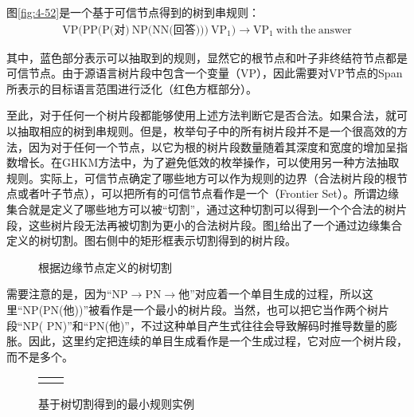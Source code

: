 \parinterval 图\ref{fig:4-52}是一个基于可信节点得到的树到串规则：
\begin{eqnarray}
\textrm{VP(PP(P(对)}\ \textrm{NP(NN(回答)))}\ \textrm{VP}_1) \rightarrow \textrm{VP}_1\ \textrm{with}\ \textrm{the}\ \textrm{answer} \nonumber
\end{eqnarray}

\noindent 其中，蓝色部分表示可以抽取到的规则，显然它的根节点和叶子非终结符节点都是可信节点。由于源语言树片段中包含一个变量（VP），因此需要对VP节点的Span所表示的目标语言范围进行泛化（红色方框部分）。

\parinterval 至此，对于任何一个树片段都能够使用上述方法判断它是否合法。如果合法，就可以抽取相应的树到串规则。但是，枚举句子中的所有树片段并不是一个很高效的方法，因为对于任何一个节点，以它为根的树片段数量随着其深度和宽度的增加呈指数增长。在GHKM方法中，为了避免低效的枚举操作，可以使用另一种方法抽取规则。实际上，可信节点确定了哪些地方可以作为规则的边界（合法树片段的根节点或者叶子节点），可以把所有的可信节点看作是一个{\small{}}（Frontier Set）。所谓边缘集合就是定义了哪些地方可以被``切割''，通过这种切割可以得到一个个合法的树片段，这些树片段无法再被切割为更小的合法树片段。图\ref{fig:4-53}给出了一个通过边缘集合定义的树切割。图右侧中的矩形框表示切割得到的树片段。

\begin{figure}[htp]
\centering

\caption{根据边缘节点定义的树切割}
\label{fig:4-53}
\end{figure}

\parinterval 需要注意的是，因为``NP$\rightarrow$PN$\rightarrow$他''对应着一个单目生成的过程，所以这里``NP(PN(他))''被看作是一个最小的树片段。当然，也可以把它当作两个树片段``NP( PN)''和``PN(他)''，不过这种单目产生式往往会导致解码时推导数量的膨胀。因此，这里约定把连续的单目生成看作是一个生成过程，它对应一个树片段，而不是多个。

\begin{figure}[htp]
\centering
\begin{tabular}{l l}
\subfigure{} &  \subfigure{}
\end{tabular}
\caption{基于树切割得到的最小规则实例}
\label{fig:4-54}
\end{figure}

